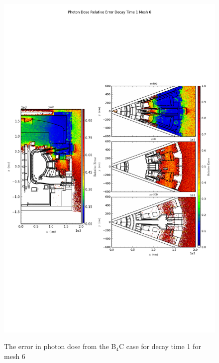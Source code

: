 \begin{figure}[ht!]
\centering
\includegraphics[trim={0cm 9cm 0cm 10cm},clip,scale=0.75]{../plots/final_model_with_b4c/Photon_Dose_Relative_Error_Decay_Time_1_Mesh_6.png}
\label{fig:photons_dc1_no4bc_m6_error}
\caption{The error in photon dose from the B$_4$C case for decay time 1 for mesh 6}
\end{figure}
